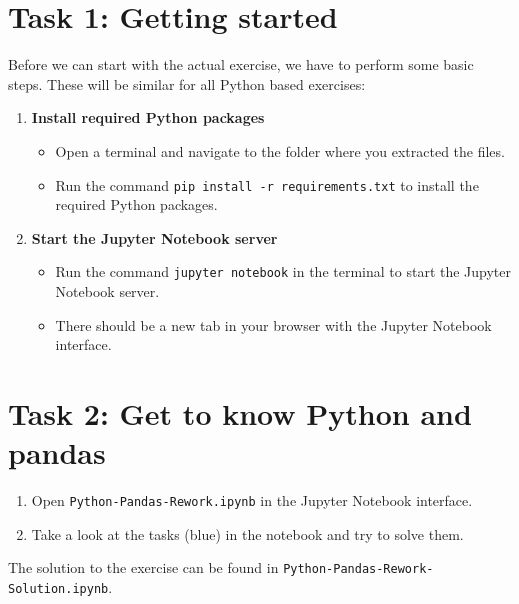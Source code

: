\documentclass[
english,
smallborders
]{../i6prcsht}
\begin{document}
\section*{Task 1: Getting started}

Before we can start with the actual exercise, we have to perform some basic steps. These will be similar for all Python based exercises:

\begin{enumerate}
	\item \textbf{Install required Python packages}

	      \begin{itemize}
		      \item Open a terminal and navigate to the folder where you extracted the files.
		      \item Run the command \texttt{pip install -r requirements.txt} to install the required Python packages.
	      \end{itemize}

	\item \textbf{Start the Jupyter Notebook server}

	      \begin{itemize}
		      \item Run the command \texttt{jupyter notebook} in the terminal to start the Jupyter Notebook server.
		      \item There should be a new tab in your browser with the Jupyter Notebook interface.
	      \end{itemize}
\end{enumerate}

\section*{Task 2: Get to know Python and pandas}

\begin{enumerate}
	\item Open \texttt{Python-Pandas-Rework.ipynb} in the Jupyter Notebook interface.
	\item Take a look at the tasks (blue) in the notebook and try to solve them.
\end{enumerate}

\begin{solution}
	The solution to the exercise can be found in \texttt{Python-Pandas-Rework-Solution.ipynb}.
\end{solution}
\end{document}
